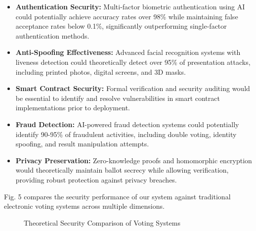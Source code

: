 \documentclass[conference]{IEEEtran}
\begin{document}
\begin{itemize}
    \item \textbf{Authentication Security:} Multi-factor biometric authentication using AI could potentially achieve accuracy rates over 98\% while maintaining false acceptance rates below 0.1\%, significantly outperforming single-factor authentication methods.
    
    \item \textbf{Anti-Spoofing Effectiveness:} Advanced facial recognition systems with liveness detection could theoretically detect over 95\% of presentation attacks, including printed photos, digital screens, and 3D masks.
    
    \item \textbf{Smart Contract Security:} Formal verification and security auditing would be essential to identify and resolve vulnerabilities in smart contract implementations prior to deployment.
    
    \item \textbf{Fraud Detection:} AI-powered fraud detection systems could potentially identify 90-95\% of fraudulent activities, including double voting, identity spoofing, and result manipulation attempts.
    
    \item \textbf{Privacy Preservation:} Zero-knowledge proofs and homomorphic encryption would theoretically maintain ballot secrecy while allowing verification, providing robust protection against privacy breaches.
\end{itemize}

Fig. 5 compares the security performance of our system against traditional electronic voting systems across multiple dimensions.

\begin{figure}[!h]
\centering
{}
\caption{Theoretical Security Comparison of Voting Systems}
\label{fig:security}
\end{figure}
\end{document}
